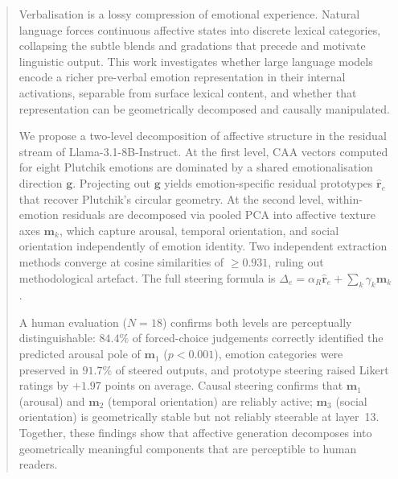 \documentclass[12pt,twoside]{report}
\begin{document}



\clearpage{\pagestyle{empty}\cleardoublepage}
\setcounter{page}{1}
\pagestyle{fancy}

\begin{abstract}
Verbalisation is a lossy compression of emotional experience. Natural language forces continuous affective states into discrete lexical categories, collapsing the subtle blends and gradations that precede and motivate linguistic output. This work investigates whether large language models encode a richer pre-verbal emotion representation in their internal activations, separable from surface lexical content, and whether that representation can be geometrically decomposed and causally manipulated.\par

We propose a two-level decomposition of affective structure in the residual stream of Llama-3.1-8B-Instruct. At the first level, CAA vectors computed for eight Plutchik emotions are dominated by a shared emotionalisation direction $\mathbf{g}$. Projecting out $\mathbf{g}$ yields emotion-specific residual prototypes $\hat{\mathbf{r}}_e$ that recover Plutchik's circular geometry. At the second level, within-emotion residuals are decomposed via pooled PCA into affective texture axes $\mathbf{m}_k$, which capture arousal, temporal orientation, and social orientation independently of emotion identity. Two independent extraction methods converge at cosine similarities of $\geq 0.931$, ruling out methodological artefact. The full steering formula is $\Delta_e = \alpha_R \hat{\mathbf{r}}_e + \sum_k \gamma_k \mathbf{m}_k$.\par

A human evaluation ($N = 18$) confirms both levels are perceptually distinguishable: $84.4\%$ of forced-choice judgements correctly identified the predicted arousal pole of $\mathbf{m}_1$ ($p < 0.001$), emotion categories were preserved in $91.7\%$ of steered outputs, and prototype steering raised Likert ratings by $+1.97$ points on average. Causal steering confirms that $\mathbf{m}_1$ (arousal) and $\mathbf{m}_2$ (temporal orientation) are reliably active; $\mathbf{m}_3$ (social orientation) is geometrically stable but not reliably steerable at layer~13. Together, these findings show that affective generation decomposes into geometrically meaningful components that are perceptible to human readers.\par
\end{abstract}
\end{document}
